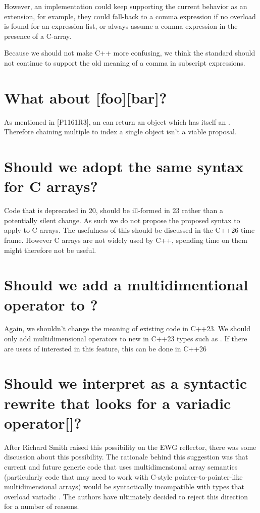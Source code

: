 \documentclass{wg21}
\begin{document}
However, an implementation could keep supporting the current behavior as an extension, for example, they could fall-back to a comma expression if no overload is found for an expression list, or always assume a comma expression in the presence of a C-array.

Because we should not make C++ more confusing, we think the standard should not continue to support the old meaning of a comma
in subscript expressions.

\section{What about [foo][bar]?}

As mentioned in [P1161R3]\cite{P1161R3}, an  can return an object which has itself an .
Therefore chaining multiple \tcode{[]} to index a single object isn't a viable proposal.

\section{Should we adopt the same syntax for C arrays?}

Code that is deprecated in 20, should be ill-formed in 23 rather than a potentially silent change.
As such we do not propose the proposed syntax to apply to C arrays.
The usefulness of this should be discussed in the C++26 time frame.
However C arrays are not widely used by C++, spending time on them might therefore not be useful.

\section{Should we add a multidimentional operator to ?}

Again, we shouldn't change the meaning of existing code in C++23.
We should only add multidimensional operators to new in C++23 types such as .
If there are users of  interested in this feature, this can be done in C++26

\section{Should we interpret  as a syntactic rewrite that looks for a variadic operator[]?}

After Richard Smith raised this possibility on the EWG reflector, there was some discussion about this possibility. The rationale behind this suggestion was that current and future generic code that uses multidimensional array semantics (particularly code that may need to work with C-style pointer-to-pointer-like multidimensional arrays) would be syntactically incompatible with types that overload variadic .  The authors have ultimately decided to reject this direction for a number of reasons.
\end{document}
